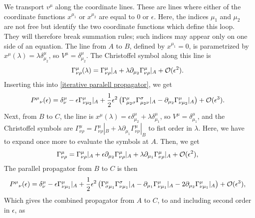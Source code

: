 We transport $v^\mu$ along the coordinate lines.
These are lines where either of the coordinate functions $x^{\mu_1}$ or $x^{\mu_2}$ are equal to $0$ or $\epsilon$.
Here, the indices $\mu_1$ and $\mu_2$ are not free but identify the two coordinate functions which define this loop.
They will therefore break summation rules; such indices may appear only on one side of an equation.
The line from $A$ to $B$, defined by $x^{\mu_1} = 0$, is parametrized by $x^\mu(\lambda) = \lambda \delta^\mu_{\mu_2}$, so $ V^\mu = \delta^\mu_{\mu_2} $.
The Christoffel symbol along this line is
%
\begin{equation}
    \Gamma^{\mu}_{\nu \rho}(\lambda) 
    = \Gamma^{\mu}_{\nu \rho}|_A
    + \lambda \partial_{\mu_2} \Gamma^{\mu}_{\nu \rho}|_A + \mathcal O(\epsilon^2).
\end{equation}
%
Inserting this into \autoref{iterative paralell propagator}, we get
%
\begin{equation}
    P^\mu{}_\nu(\epsilon)
    = \delta^\mu_\nu 
    - \epsilon \Gamma^{\mu}_{\nu \mu_2}|_A
    + \frac{1}{2} \epsilon^2 
    \left(
        \Gamma^\mu_{\mu_2 \sigma}\Gamma^\sigma_{\mu_2 \nu} |_A 
        -\partial_{\mu_2} \Gamma^{\mu}_{\nu \mu_2}|_A 
    \right)
    + \mathcal O(\epsilon^3).
\end{equation}
%
Next, from $B$ to $C$, the line is $x^\mu(\lambda) = \epsilon \delta^\mu_{\mu_2} + \lambda \delta^{\mu}_{\mu_1}$, so $V^\mu = \delta^\mu_{\mu_1}$, and the Christoffel symbols are 
$ 
\Gamma^{\mu}_{\nu\rho}
= 
\Gamma^{\mu}_{\nu \rho}|_B
+ \lambda \partial_{\mu_1} \Gamma^{\mu}_{\nu \rho}|_B
$
to fist order in $\lambda$.
Here, we have to expand once more to evaluate the symbols at $A$.
Then, we get
%
\begin{equation}
    \Gamma^{\mu}_{\nu\rho}
    =
    \Gamma^{\mu}_{\nu \rho}|_A + \epsilon \partial_{\mu_2} \Gamma^{\mu}_{\nu \rho}|_A
    + \lambda \partial_{\mu_1} \Gamma^{\mu}_{\nu \rho}|_A + \mathcal O(\epsilon^2),
\end{equation}
%
The parallel propagator from $B$ to $C$ is then
%
\begin{equation}
    P^{\mu}{}_\nu(\epsilon)
    = 
    \delta^\mu_\nu
    - \epsilon \Gamma^{\mu}_{\nu \mu_1}|_A 
    + \frac{1}{2}\epsilon^2
    \left(
        \Gamma^\mu_{\sigma \mu_1}\Gamma^\sigma_{\nu \mu_1}|_A
        - \partial_{\mu_1} \Gamma^{\mu}_{\nu \mu_1}|_A
        - 2 \partial_{\mu_2} \Gamma^{\mu}_{\nu \mu_1}|_A
    \right)
    + \mathcal O(\epsilon^3),
\end{equation}
%
Which gives the combined propagator from $A$ to $C$, to and including second order in $\epsilon$, as
